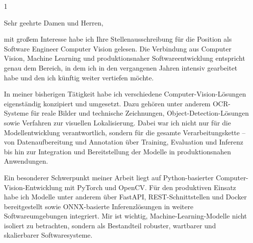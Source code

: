 \documentclass[10pt,a4paper,withhyper]{../altacv}
\begin{document}


\makecvheader

\begin{paracol}{1}


    Sehr geehrte Damen und Herren,

    \vspace{2em}

    mit großem Interesse habe ich Ihre Stellenausschreibung für die Position als Software Engineer Computer Vision gelesen. Die Verbindung aus Computer Vision, Machine Learning und produktionsnaher Softwareentwicklung entspricht genau dem Bereich, in dem ich in den vergangenen Jahren intensiv gearbeitet habe und den ich künftig weiter vertiefen möchte.

    \vspace{2em}

    In meiner bisherigen Tätigkeit habe ich verschiedene Computer-Vision-Lösungen eigenständig konzipiert und umgesetzt. Dazu gehören unter anderem OCR-Systeme für reale Bilder und technische Zeichnungen, Object-Detection-Lösungen sowie Verfahren zur visuellen Lokalisierung. Dabei war ich nicht nur für die Modellentwicklung verantwortlich, sondern für die gesamte Verarbeitungskette – von Datenaufbereitung und Annotation über Training, Evaluation und Inferenz bis hin zur Integration und Bereitstellung der Modelle in produktionsnahen Anwendungen.

    \vspace{2em}

    Ein besonderer Schwerpunkt meiner Arbeit liegt auf Python-basierter Computer-Vision-Entwicklung mit PyTorch und OpenCV. Für den produktiven Einsatz habe ich Modelle unter anderem über FastAPI, REST-Schnittstellen und Docker bereitgestellt sowie ONNX-basierte Inferenzlösungen in weitere Softwareumgebungen integriert. Mir ist wichtig, Machine-Learning-Modelle nicht isoliert zu betrachten, sondern als Bestandteil robuster, wartbarer und skalierbarer Softwaresysteme.


\end{paracol}
\end{document}
